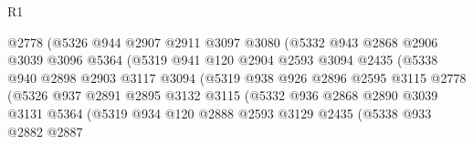 \begin{lexlean}{R1}
\begin{coremodule}
                              @2778
                              (@5326
                                @944
                                @2907
                                @2911
                                @3097
                                @3080
                                (@5332
                                  @943
                                  @2868
                                  @2906
                                  @3039
                                  @3096
                                  @5364
                                  (@5319
                                    @941
                                    @120
                                    @2904
                                    @2593
                                    @3094
                                    @2435
                                    (@5338
                                      @940
                                      @2898
                                      @2903
                                      @3117
                                      @3094
                                      (@5319
                                        @938
                                        @926
                                        @2896
                                        @2595
                                        @3115
                                        @2778
                                        (@5326
                                          @937
                                          @2891
                                          @2895
                                          @3132
                                          @3115
                                          (@5332
                                            @936
                                            @2868
                                            @2890
                                            @3039
                                            @3131
                                            @5364
                                            (@5319
                                              @934
                                              @120
                                              @2888
                                              @2593
                                              @3129
                                              @2435
                                              (@5338
                                                @933
                                                @2882
                                                @2887

\end{coremodule}
\end{lexlean}
